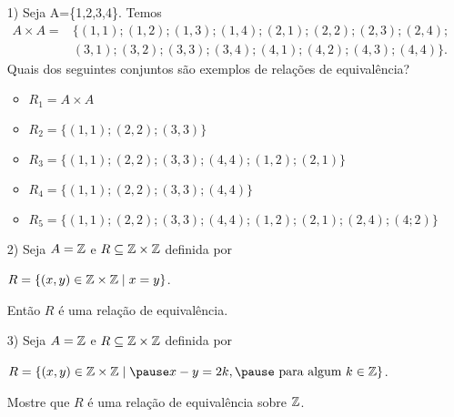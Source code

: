 \documentclass{beamer}
\begin{document}
    \begin{frame}
        \begin{exemplos}
            \begin{itemize}
                \item[1)] Seja A=\{1,2,3,4\}. Temos
                \begin{align*}
                    A\times A = &\{(1,1);(1,2);(1,3);(1,4);(2,1);(2,2);(2,3);(2,4);\\ &(3,1);(3,2);(3,3);(3,4);(4,1);(4,2);(4,3);(4,4)\}.
                \end{align*}
                Quais dos seguintes conjuntos s\~ao exemplos de rela{\c c}{\~o}es de equival{\^e}ncia?
                \begin{itemize}
                    \item $R_{1}= A\times A$
                    \item $R_{2}=\{(1,1);(2,2);(3,3)\}$
                    \item $R_{3}=\{(1,1);(2,2);(3,3);(4,4);(1,2);(2,1)\}$
                    \item $R_{4}=\{(1,1);(2,2);(3,3);(4,4)\}$
                    \item $R_{5}=\{(1,1);(2,2);(3,3);(4,4);(1,2);(2,1);(2,4);(4;2)\}$
                \end{itemize}
            \end{itemize}
        \end{exemplos}
    \end{frame}
    \begin{frame}
        \begin{exemplos}
            \begin{itemize}[label={\arabic*})]
                \item[2)] Seja $A = \mathbb{Z}$ \pause e $R\subseteq \mathbb{Z}\times \mathbb{Z}$ \pause definida por \pause
                \begin{center}
                    $R = \{(x,y)\in \mathbb{Z} \times \mathbb{Z} \mid x = y\}$.\pause  
                \end{center}
                Ent\~ao $R$ {\'e} uma rela{\c c}{\~a}o de equival{\^e}ncia.\pause
            \end{itemize}
        \end{exemplos}
    \end{frame}
    \begin{frame}
    \end{frame}
    \begin{frame}
        \begin{exemplos}
            \begin{itemize}[label={\arabic*})]                
                \item[3)] Seja $A = \mathbb{Z}$ \pause e $R\subseteq \mathbb{Z}\times \mathbb{Z}$ \pause definida por
                \begin{center}
                    $R = \{(x,y)\in \z \times \z \mid \pause x - y = 2k, \pause \mbox{ para algum } k \in \z\}$.\pause
                \end{center}
                 Mostre que $R$ \'e uma rela{\c c}{\~a}o de equival{\^e}ncia sobre $\mathbb{Z}$.\pause
            \end{itemize}
        \end{exemplos}
    \end{frame}
    \begin{frame}
    \end{frame}
\end{document}
